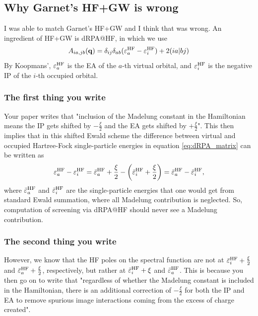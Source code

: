 \subsection{Why Garnet's HF+GW is wrong}
I was able to match Garnet's HF+GW and I think that was wrong. 
An ingredient of HF+GW is dRPA@HF, in which we use
\begin{equation}
    A_{ia,jb}(\mathbf{q}) = \delta_{ij} \delta_{ab} (\varepsilon_a^{\rm HF} - \varepsilon_i^{\rm HF}) + 2 (ia|bj)
\label{eq:dRPA_matrix}
\end{equation}
By Koopmans', $\varepsilon_a^{\rm HF}$ is the EA of the $a$-th virtual orbital, and $\varepsilon_i^{\rm HF}$ is the negative IP of the $i$-th occupied orbital. 
\subsubsection{The first thing you write }
Your paper writes that "inclusion of the Madelung constant in the Hamiltonian means the IP gets shifted by $-\frac{\xi}{2}$ and the EA gets shifted by $+\frac{\xi}{2}$". This then implies that in this shifted Ewald scheme the difference between virtual and occupied Hartree-Fock single-particle energies in equation \eqref{eq:dRPA_matrix} can be written as 
\begin{equation}
    \varepsilon_a^{\rm HF} - \varepsilon_i^{\rm HF} = \bar{\varepsilon}_a^{\rm HF} + \frac{\xi}{2} - \left(\bar{\varepsilon}_i^{\rm HF} + \frac{\xi}{2}\right) = \bar{\varepsilon}_a^{\rm HF} - \bar{\varepsilon}_i^{\rm HF},
\end{equation}
where $\bar{\varepsilon}_a^{\rm HF}$ and $\bar{\varepsilon}_i^{\rm HF}$ are the single-particle energies that one would get from standard Ewald summation, where all Madelung contribution is neglected.  So, computation of screening via dRPA@HF should never see a Madelung contribution.
\subsubsection{The second thing you write}
However, we know that the HF poles on the spectral function are not at $\bar{\varepsilon}_i^{\rm HF}+\frac{\xi}{2}$ and $\bar{\varepsilon}_a^{\rm HF}+\frac{\xi}{2}$, respectively, but rather at $\bar{\varepsilon}_i^{\rm HF} +\xi$ and $\bar{\varepsilon}_a^{\rm HF}$. This is because you then go on to write that "regardless of whether the Madelung constant is included in the Hamiltonian, there is an additional correction of $-\frac{\xi}{2}$ for both the IP and EA to remove spurious image interactions coming from the excess of charge created". 
